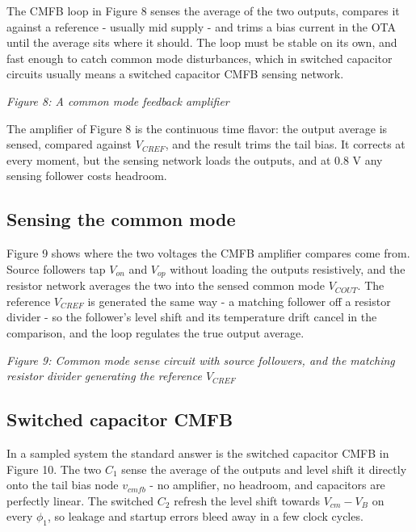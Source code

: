 The CMFB loop in Figure 8 senses the average of the two outputs,
compares it against a reference - usually mid supply - and trims a bias
current in the OTA until the average sits where it should. The loop must
be stable on its own, and fast enough to catch common mode disturbances,
which in switched capacitor circuits usually means a switched capacitor
CMFB sensing network.


{
\centering
{}
}

\emph{Figure 8: A common mode feedback amplifier}

The amplifier of Figure 8 is the continuous time flavor: the output
average is sensed, compared against \(V_{CREF}\), and the result trims
the tail bias. It corrects at every moment, but the sensing network
loads the outputs, and at 0.8 V any sensing follower costs headroom.

\subsection{Sensing the common mode}\label{sensing-the-common-mode}

Figure 9 shows where the two voltages the CMFB amplifier compares come
from. Source followers tap \(V_{on}\) and \(V_{op}\) without loading the
outputs resistively, and the resistor network averages the two into the
sensed common mode \(V_{COUT}\). The reference \(V_{CREF}\) is generated
the same way - a matching follower off a resistor divider - so the
follower's level shift and its temperature drift cancel in the
comparison, and the loop regulates the true output average.


{
\centering
{}
}

\emph{Figure 9: Common mode sense circuit with source followers, and the
matching resistor divider generating the reference \(V_{CREF}\)}

\subsection{Switched capacitor CMFB}\label{switched-capacitor-cmfb}

In a sampled system the standard answer is the switched capacitor CMFB
in Figure 10. The two \(C_1\) sense the average of the outputs and level
shift it directly onto the tail bias node \(v_{cmfb}\) - no amplifier,
no headroom, and capacitors are perfectly linear. The switched \(C_2\)
refresh the level shift towards \(V_{cm} - V_B\) on every \(\phi_1\), so
leakage and startup errors bleed away in a few clock cycles.


